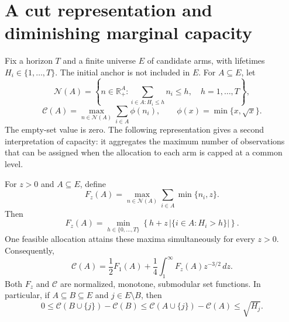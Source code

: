 
\section{A cut representation and diminishing marginal capacity}
\label{sec:capacity-submodularity}

Fix a horizon $T$ and a finite universe $E$ of candidate arms, with
lifetimes $H_i\in\{1,\ldots,T\}$. The initial anchor is not included in $E$.
For $A\subseteq E$, let
\[
 \mathcal N(A)=\left\{n\in\mathbb R_+^A:
       \sum_{i\in A:H_i\le h}n_i\le h,
       \quad h=1,\ldots,T\right\},
\]
\[
 \mathscr C(A)=\max_{n\in\mathcal N(A)}\sum_{i\in A}\phi(n_i),
 \qquad \phi(x)=\min\{x,\sqrt{x}\}.
\]
The empty-set value is zero. The following representation gives a
second interpretation of capacity: it aggregates the maximum number of
observations that can be assigned when the allocation to each arm is
capped at a common level.

\begin{theorem}
\label{thm:capacity-submodular}
For $z>0$ and $A\subseteq E$, define
\[
 F_z(A)=\max_{n\in\mathcal N(A)}\sum_{i\in A}\min\{n_i,z\}.
\]
Then
\begin{equation}
 F_z(A)=\min_{h\in\{0,\ldots,T\}}
       \left\{h+z\,|\{i\in A:H_i>h\}|\right\}.
 \label{eq:capacity-cut}
\end{equation}
One feasible allocation attains these maxima simultaneously for every
$z>0$. Consequently,
\begin{equation}
 \mathscr C(A)=\frac12F_1(A)
       +\frac14\int_1^\infty F_z(A)z^{-3/2}\,dz.
 \label{eq:capacity-integral}
\end{equation}
Both $F_z$ and $\mathscr C$ are normalized, monotone, submodular set functions. In
particular, if $A\subseteq B\subseteq E$ and $j\in E\setminus B$, then
\begin{equation}
 0\le \mathscr C(B\cup\{j\})-\mathscr C(B)
 \le \mathscr C(A\cup\{j\})-\mathscr C(A)
 \le\sqrt{H_j}.
 \label{eq:capacity-diminishing}
\end{equation}
\end{theorem}

